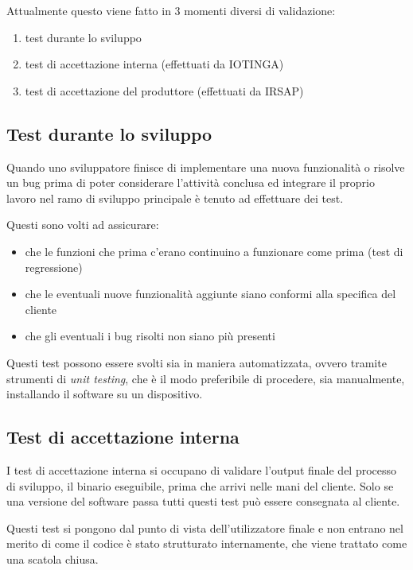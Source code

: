 \documentclass[12pt,a4paper,twoside,titlepage]{book}
\begin{document}
Attualmente questo viene fatto in 3 momenti diversi di validazione:

\begin{enumerate}
    \item test durante lo sviluppo
    \item test di accettazione interna (effettuati da IOTINGA)
    \item test di accettazione del produttore (effettuati da IRSAP)
\end{enumerate}

\subsection{Test durante lo sviluppo}
\label{subsection:test_sviluppo}

Quando uno sviluppatore finisce di implementare una nuova funzionalità o risolve un
bug prima di poter considerare l'attività conclusa ed integrare il
proprio lavoro nel ramo di sviluppo principale è tenuto ad effettuare dei test.

Questi sono volti ad assicurare:
\begin{itemize}
    \item che le funzioni che prima c'erano continuino a funzionare come prima (test di regressione)
    \item che le eventuali nuove funzionalità aggiunte siano conformi alla specifica del cliente
    \item che gli eventuali i bug risolti non siano più presenti 
\end{itemize}

Questi test possono essere svolti sia in maniera automatizzata, ovvero tramite strumenti di 
\textit{unit testing}, che è il modo preferibile di procedere, sia manualmente, installando 
il software su un dispositivo. 

\subsection{Test di accettazione interna}
\label{subsection:test_accettazione_interna}

I test di accettazione interna si occupano di validare l'output finale del processo di sviluppo, 
il binario eseguibile, prima che arrivi nelle mani del cliente.  
Solo se una versione del software passa tutti questi test può essere consegnata al cliente.

Questi test si pongono dal punto di vista dell'utilizzatore finale e non entrano nel merito di come 
il codice è stato strutturato internamente, che viene trattato come una scatola chiusa. 
\end{document}
